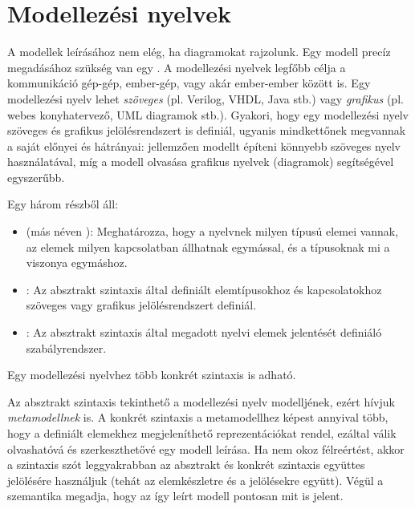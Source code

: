 
\section{Modellezési nyelvek}

A modellek leírásához nem elég, ha diagramokat rajzolunk. Egy modell precíz megadásához szükség van egy . A modellezési nyelvek legfőbb célja a kommunikáció gép-gép, ember-gép, vagy akár ember-ember között is. Egy modellezési nyelv lehet \emph{szöveges} (pl. Verilog, VHDL, Java stb.) vagy \emph{grafikus} (pl. webes konyhatervező, UML diagramok stb.). Gyakori, hogy egy modellezési nyelv szöveges és grafikus jelölésrendszert is definiál, ugyanis mindkettőnek megvannak a saját előnyei és hátrányai: jellemzően modellt építeni könnyebb szöveges nyelv használatával, míg a modell olvasása grafikus nyelvek (diagramok) segítségével egyszerűbb.

\begin{definicio}
	Egy  három részből áll:
	\begin{itemize}
		\item {} (más néven ): Meghatározza, hogy a nyelvnek milyen típusú elemei vannak, az elemek milyen kapcsolatban állhatnak egymással, és a típusoknak mi a viszonya egymáshoz.
		\item {}: Az absztrakt szintaxis által definiált elemtípusokhoz és kapcsolatokhoz szöveges vagy grafikus jelölésrendszert definiál.
		\item {}: Az absztrakt szintaxis által megadott nyelvi elemek jelentését definiáló szabályrendszer.
	\end{itemize}
	Egy modellezési nyelvhez több konkrét szintaxis is adható.
\end{definicio}

Az absztrakt szintaxis tekinthető a modellezési nyelv modelljének, ezért hívjuk \emph{metamodellnek} is. A konkrét szintaxis a metamodellhez képest annyival több, hogy a definiált elemekhez megjeleníthető reprezentációkat rendel, ezáltal válik olvashatóvá és szerkeszthetővé egy modell leírása. Ha nem okoz félreértést, akkor a szintaxis szót leggyakrabban az absztrakt és konkrét szintaxis együttes jelölésére használjuk (tehát az elemkészletre és a jelölésekre együtt). Végül a szemantika megadja, hogy az így leírt modell pontosan mit is jelent. 

